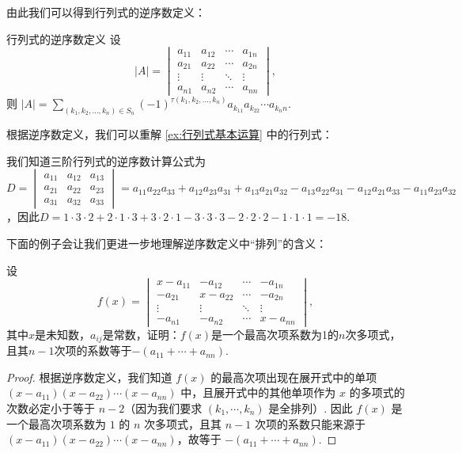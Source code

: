 由此我们可以得到行列式的逆序数定义：

\begin{theorem}{行列式的逆序数定义}{}
    设
    \[|A| = \begin{vmatrix}
            a_{11} & a_{12} & \cdots & a_{1n} \\
            a_{21} & a_{22} & \cdots & a_{2n} \\
            \vdots & \vdots & \ddots & \vdots \\
            a_{n1} & a_{n2} & \cdots & a_{nn}
        \end{vmatrix},\]
    则 $|A| = \sum\limits_{(k_1,k_2,\ldots,k_n) \in S_n} (-1)^{\tau(k_1,k_2,\ldots,k_n)}a_{k_11}a_{k_22}\cdots a_{k_nn}$.
\end{theorem}

根据逆序数定义，我们可以重解 \autoref{ex:行列式基本运算} 中的行列式：
\begin{solution}
    我们知道三阶行列式的逆序数计算公式为 $D=\begin{vmatrix}
        a_{11} & a_{12} & a_{13} \\
        a_{21} & a_{22} & a_{23} \\
        a_{31} & a_{32} & a_{33}
    \end{vmatrix}=a_{11}a_{22}a_{33}+a_{12}a_{23}a_{31}+a_{13}a_{21}a_{32}-a_{13}a_{22}a_{31}-a_{12}a_{21}a_{33}-a_{11}a_{23}a_{32}$，因此$D=1 \cdot 3 \cdot 2+2 \cdot 1 \cdot 3+3 \cdot 2 \cdot 1-3 \cdot 3 \cdot 3-2 \cdot 2 \cdot 2-1 \cdot 1 \cdot 1=-18$.
\end{solution}

下面的例子会让我们更进一步地理解逆序数定义中``排列''的含义：
\begin{example}{}{}
    设
    \[f(x)=\begin{vmatrix}
        x-a_{11} & -a_{12} & \cdots & -a_{1n} \\
        -a_{21} & x-a_{22} & \cdots & -a_{2n} \\
        \vdots & \vdots & \ddots & \vdots \\
        -a_{n1} & -a_{n2} & \cdots & x-a_{nn}
    \end{vmatrix},\]
    其中$x$是未知数，$a_{ij}$是常数，证明：$f(x)$是一个最高次项系数为1的$n$次多项式，且其$n-1$次项的系数等于$-(a_{11}+\cdots+a_{nn})$.
\end{example}

\begin{proof}
    根据逆序数定义，我们知道 $f(x)$ 的最高次项出现在展开式中的单项 $(x-a_{11})(x-a_{22})\cdots(x-a_{nn})$ 中，且展开式中的其他单项作为 $x$ 的多项式的次数必定小于等于 $n-2$（因为我们要求 $(k_1,\cdots,k_n)$ 是全排列）. 因此 $f(x)$ 是一个最高次项系数为 $1$ 的 $n$ 次多项式，且其 $n-1$ 次项的系数只能来源于 $(x-a_{11})(x-a_{22})\cdots(x-a_{nn})$，故等于 $-(a_{11}+\cdots+a_{nn})$.
\end{proof}

